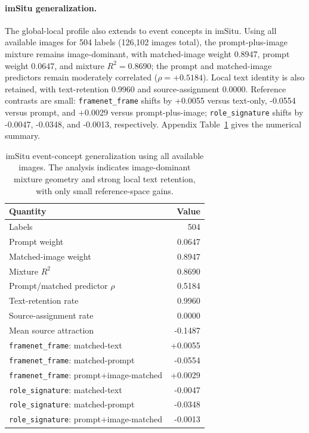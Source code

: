 \documentclass{article}
\begin{document}
\paragraph{imSitu generalization.}
The global-local profile also extends to event concepts in imSitu. Using all available images for 504 labels (126,102 images total), the prompt-plus-image mixture remains image-dominant, with matched-image weight 0.8947, prompt weight 0.0647, and mixture \(R^2=0.8690\); the prompt and matched-image predictors remain moderately correlated (\(\rho=+0.5184\)). Local text identity is also retained, with text-retention 0.9960 and source-assignment 0.0000. Reference contrasts are small: \texttt{framenet\_frame} shifts by +0.0055 versus text-only, -0.0554 versus prompt, and +0.0029 versus prompt-plus-image; \texttt{role\_signature} shifts by -0.0047, -0.0348, and -0.0013, respectively. Appendix Table~\ref{tab:imsitu_generalization} gives the numerical summary.

\begin{table}[!htbp]
\centering
\caption{imSitu event-concept generalization using all available images. The analysis indicates image-dominant mixture geometry and strong local text retention, with only small reference-space gains.}
\label{tab:imsitu_generalization}
\small
\begin{tabular}{lr}
\toprule
Quantity & Value \\
\midrule
Labels & 504 \\
Prompt weight & 0.0647 \\
Matched-image weight & 0.8947 \\
Mixture \(R^2\) & 0.8690 \\
Prompt/matched predictor \(\rho\) & 0.5184 \\
Text-retention rate & 0.9960 \\
Source-assignment rate & 0.0000 \\
Mean source attraction & -0.1487 \\
\midrule
\texttt{framenet\_frame}: matched-text & +0.0055 \\
\texttt{framenet\_frame}: matched-prompt & -0.0554 \\
\texttt{framenet\_frame}: prompt+image-matched & +0.0029 \\
\texttt{role\_signature}: matched-text & -0.0047 \\
\texttt{role\_signature}: matched-prompt & -0.0348 \\
\texttt{role\_signature}: prompt+image-matched & -0.0013 \\
\bottomrule
\end{tabular}
\end{table}
\end{document}
